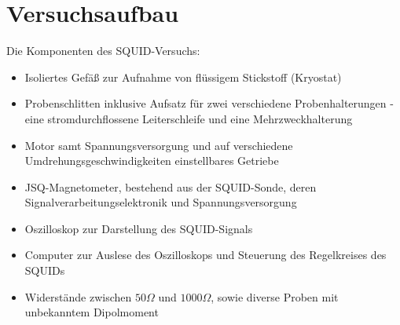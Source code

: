 \documentclass[12pt]{article}
\begin{document}
\section{Versuchsaufbau}
Die Komponenten des SQUID-Versuchs:
\begin{itemize}
 \item Isoliertes Gefäß zur Aufnahme von flüssigem Stickstoff (Kryostat)
 \item Probenschlitten inklusive Aufsatz für zwei verschiedene Probenhalterungen - eine stromdurchflossene Leiterschleife und eine Mehrzweckhalterung
 \item Motor samt Spannungsversorgung und auf verschiedene Umdrehungsgeschwindigkeiten einstellbares Getriebe
 \item JSQ-Magnetometer, bestehend aus der SQUID-Sonde, deren Signalverarbeitungselektronik und Spannungsversorgung
 \item Oszilloskop zur Darstellung des SQUID-Signals
 \item Computer zur Auslese des Oszilloskops und Steuerung des Regelkreises des SQUIDs
 \item Widerstände zwischen $50\Omega$ und $1000\Omega$, sowie diverse Proben mit unbekanntem Dipolmoment
\end{itemize}
\end{document}
